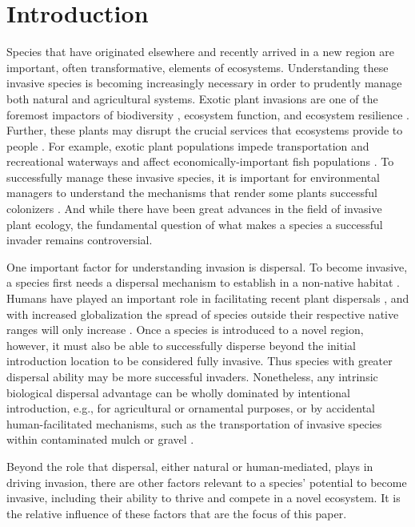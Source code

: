 \documentclass[12pt]{article}\usepackage[]{graphicx}\usepackage[]{color}
\begin{document}
	\section{Introduction}
	Species that have originated elsewhere and recently arrived in a new region are important, often transformative, elements of ecosystems. Understanding these invasive species is becoming increasingly necessary in order to prudently manage both natural and agricultural systems. Exotic plant invasions are one of the foremost impactors of biodiversity \parencite{Bellard2016,Clavero2005,Walker1997}, ecosystem function, and ecosystem resilience \parencite{Daehler1999,Daehler1994,Ehrenfeld2003,Wilcove1998}. Further, these plants may disrupt the crucial services that ecosystems provide to people \parencite{Pejchar2009,Pimentel2005,Pysek2010}. For example, exotic plant populations impede transportation and recreational waterways and affect economically-important fish populations \parencite{OTA1993}. To successfully manage these invasive species, it is important for environmental managers to understand the mechanisms that render some plants successful colonizers \parencite{Hulme2013}. And while there have been great advances in the field of invasive plant ecology, the fundamental question of what makes a species a successful invader remains controversial.
	
	One important factor for understanding invasion is dispersal. To become invasive, a species first needs a dispersal mechanism to establish in a non-native habitat \parencite{Mark2001,Westphal2008}. Humans have played an important role in facilitating recent plant dispersals \parencite{McKinney1999,Pysek2002,Vitousek1996}, and with increased globalization the spread of species outside their respective native ranges will only increase \parencite{Helmus2014}. Once a species is introduced to a novel region, however, it must also be able to successfully disperse beyond the initial introduction location to be considered fully invasive. Thus species with greater dispersal ability may be more successful invaders.  Nonetheless, any intrinsic biological dispersal advantage can be wholly dominated by intentional introduction, e.g., for agricultural or ornamental purposes, or by accidental human-facilitated mechanisms, such as the transportation of invasive species within contaminated mulch or gravel \parencite{Wittenberg2001}. 
	
	Beyond the role that dispersal, either natural or human-mediated, plays in driving invasion, there are other factors relevant to a species’ potential to become invasive, including their ability to thrive and compete in a novel ecosystem. It is the relative influence of these factors that are the focus of this paper.
	
\end{document}
